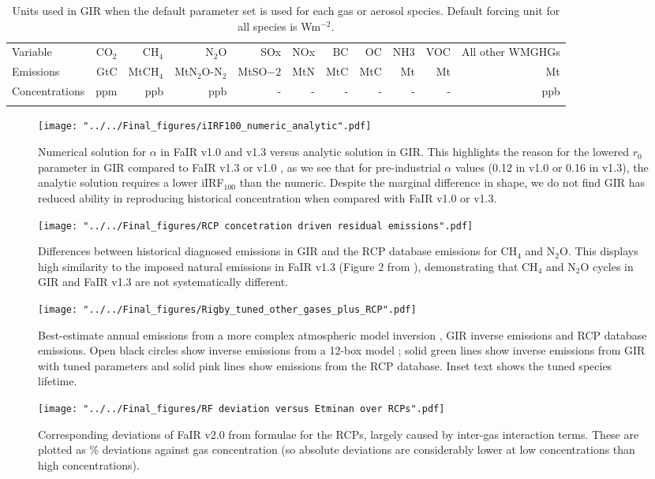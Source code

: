 \documentclass[gmd, manuscript]{copernicus}
\begin{document}
\begin{table}[t]
    \caption{Units used in GIR when the default parameter set is used for each gas or aerosol species. Default forcing unit for all species is Wm$^{-2}$.} \label{tab:units}
    \begin{tabular}{l r r r r r r r r r r}
    \tophline
    Variable & CO$_2$ & CH$_4$ & N$_2$O & SOx & NOx & BC & OC & NH3 & VOC & All other WMGHGs\\
    \middlehline
    Emissions & GtC & MtCH$_4$ & MtN$_2$O-N$_2$ & MtSO$-2$ & MtN & MtC & MtC & Mt & Mt & Mt  \\
    Concentrations & ppm & ppb & ppb & - & - & - & - & - & - & ppb \\
    \bottomhline
    \end{tabular}
    \belowtable{} %
\end{table}
\clearpage
\begin{figure}[t]
    \texttt{[image: "../../Final\_figures/iIRF100\_numeric\_analytic".pdf]}
    \caption{Numerical solution for $\alpha$ in FaIR v1.0 and v1.3 versus analytic solution in GIR. This highlights the reason for the lowered $r_0$ parameter in GIR compared to FaIR v1.3 \citep{Smith2017} or v1.0 \citep{Millar2016}, as we see that for pre-industrial $\alpha$ values (0.12 in v1.0 or 0.16 in v1.3), the analytic solution requires a lower iIRF$_{100}$ than the numeric. Despite the marginal difference in shape, we do not find GIR has reduced ability in reproducing historical concentration when compared with FaIR v1.0 or v1.3.}
\end{figure}
\clearpage
\begin{figure}[t]
    \texttt{[image: "../../Final\_figures/RCP concetration driven residual emissions".pdf]}
    \caption{Differences between historical diagnosed emissions in GIR and the RCP database emissions for CH$_4$ and N$_2$O. This displays high similarity to the imposed natural emissions in FaIR v1.3 (Figure 2 from \cite{Smith2017}), demonstrating that CH$_4$ and N$_2$O cycles in GIR and FaIR v1.3 are not systematically different.}
\end{figure}
\clearpage
\begin{figure}[t]
    \texttt{[image: "../../Final\_figures/Rigby\_tuned\_other\_gases\_plus\_RCP".pdf]}
    \caption{Best-estimate annual emissions from a more complex atmospheric model inversion \cite{Rigby2014}, GIR inverse emissions and RCP database emissions. Open black circles show inverse emissions from a 12-box model \cite{Cunnold1994}; solid green lines show inverse emissions from GIR with tuned parameters and solid pink lines show emissions from the RCP database. Inset text shows the tuned species lifetime.}
\end{figure}
\clearpage
\begin{figure}[t]
    \texttt{[image: "../../Final\_figures/RF deviation versus Etminan over RCPs".pdf]}
    \caption{Corresponding deviations of FaIR v2.0 from \cite{Etminan2016} formulae for the RCPs, largely caused by inter-gas interaction terms. These are plotted as \% deviations against gas concentration (so absolute deviations are considerably lower at low concentrations than high concentrations).}
\end{figure}
\clearpage
\end{document}
